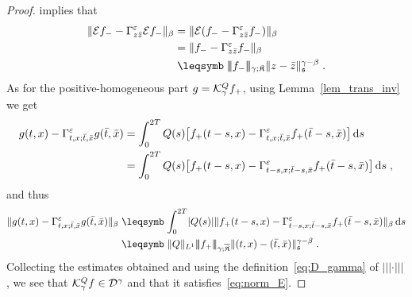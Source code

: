 \documentclass[reqno,11pt]{article}
\def\normDgamma#1{|\!|\!|#1|\!|\!|}
\def\fraks{\mathfrak{s}}
\def\fraK{\mathfrak{K}}
\def\fraKbar{\overline{\mathfrak{K}}}
\begin{document}
\begin{proof}
implies that 
\begin{align*}
\norm{\cE f_- - \Gamma^\eps_{z\bar z}\cE f_-}_\beta 
&= \norm{\cE(f_- - \Gamma^\eps_{z\bar z} f_-)}_\beta \\
&= \norm{f_- - \Gamma^\eps_{z\bar z} f_-}_\beta \\
&\leqs \normDgamma{f_-}_{\gamma;\fraK} \norm{z-\bar z}^{\gamma-\beta}_\fraks\;.
\end{align*}
As for the positive-homogeneous part $g={\mathcal K}^Q_\gamma f_+$, using
Lemma~\ref{lem_trans_inv} we get 
\begin{align*}
g(t,x) 
- \Gamma^\varepsilon_{t,x;\bar t,\bar x}g(\bar t,\bar x) 
&= \int_0^{2T} Q(s) \bigl[f_+(t-s,x) - \Gamma^\varepsilon_{t,x;\bar t,\bar x}
f_+(\bar t-s,\bar x)\bigr]\operatorname{d}\!s \\
&= \int_0^{2T} Q(s) \bigl[f_+(t-s,x) - \Gamma^\varepsilon_{t-s,x;\bar t-s,\bar x}
f_+(\bar t-s,\bar x)\bigr]\operatorname{d}\!s\;, 
\end{align*}
and thus
\begin{align*}
\norm{g(t,x) 
- \Gamma^\eps_{t,x;\bar t,\bar x}g(\bar t,\bar x)}_\beta
&\leqs \int_0^{2T} \abs{Q(s)} \norm{f_+(t-s,x) - \Gamma^\eps_{t-s,x;\bar
t-s,\bar x} f_+(\bar t-s,\bar x)}_\beta\6s\\
&\leqs \norm{Q}_{L^1} \normDgamma{f_+}_{\gamma;\fraKbar} \norm{(t,x)-(\bar
t,\bar x)}^{\gamma-\beta}_\fraks\;.
\end{align*}
Collecting the estimates obtained and using the definition~\eqref{eq:D_gamma} of
$\normDgamma{\cdot}$, we see that ${\mathcal K}^Q_\gamma f\in{\mathcal D}^\gamma$ and that it
satisfies~\eqref{eq:norm_E}. 


\end{proof}
\end{document}
